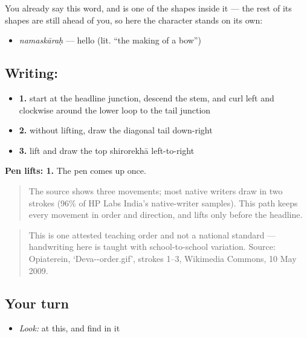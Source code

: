 You already say this word, and  is one of the shapes inside it — the rest of its shapes are still ahead of you, so here the character stands on its own:

\begin{itemize}
\raggedright
  \item \emph{namaskāraḥ} — hello (lit. \textquotedblleft{}the making of a bow\textquotedblright{})
\end{itemize}

\subsection*{Writing: }

\begin{itemize}
\raggedright
  \item \textbf{1.} start at the headline junction, descend the stem, and curl left and clockwise around the lower loop to the tail junction
  \item \textbf{2.} without lifting, draw the diagonal tail down-right
  \item \textbf{3.} lift and draw the top shirorekhā left-to-right
\end{itemize}

\textbf{Pen lifts: 1.} The pen comes up once.

\begin{quote}
The source shows three movements; most native writers draw  in two strokes (96\% of HP Labs India's native-writer samples). This path keeps every movement in order and direction, and lifts only before the headline.
\end{quote}

\begin{quote}
This is one attested teaching order and not a national standard — handwriting here is taught with school-to-school variation. Source: Opiaterein, ‘Deva--order.gif’, strokes 1–3, Wikimedia Commons, 10 May 2009.
\end{quote}

\subsection*{Your turn}
\begin{itemize}
\raggedright
  \item \emph{Look:} at this, and find  in it
\end{itemize}

